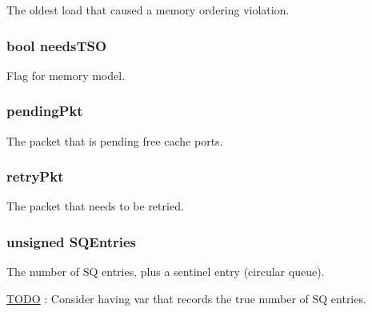 The oldest load that caused a memory ordering violation. \hypertarget{classLSQUnit_abef3db582145f640478056f8413a03e3}{
\subsubsection[{needsTSO}]{\setlength{\rightskip}{0pt plus 5cm}bool {\bf needsTSO}}}
\label{classLSQUnit_abef3db582145f640478056f8413a03e3}
Flag for memory model. \hypertarget{classLSQUnit_a54d6e1b7bac876ca215b09777bae1d34}{
\subsubsection[{pendingPkt}]{ {\bf pendingPkt}}}
\label{classLSQUnit_a54d6e1b7bac876ca215b09777bae1d34}
The packet that is pending free cache ports. \hypertarget{classLSQUnit_a314ae93c04b3ca96e79e1b1f39a8e478}{
\subsubsection[{retryPkt}]{ {\bf retryPkt}}}
\label{classLSQUnit_a314ae93c04b3ca96e79e1b1f39a8e478}
The packet that needs to be retried. \hypertarget{classLSQUnit_a38c8af5392da70119dc5cce4e3637cbc}{
\subsubsection[{SQEntries}]{\setlength{\rightskip}{0pt plus 5cm}unsigned {\bf SQEntries}}}
\label{classLSQUnit_a38c8af5392da70119dc5cce4e3637cbc}
The number of SQ entries, plus a sentinel entry (circular queue). \begin{Desc}
\item[\hyperlink{todo__todo000037}{TODO}]: Consider having var that records the true number of SQ entries. \end{Desc}
